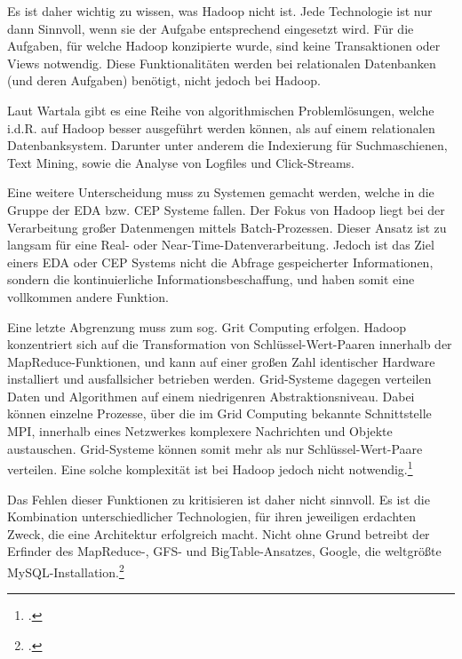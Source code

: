 Es ist daher wichtig zu wissen, was Hadoop nicht ist. Jede Technologie ist nur dann Sinnvoll, wenn sie der Aufgabe entsprechend eingesetzt wird. Für die Aufgaben, für welche Hadoop konzipierte wurde, sind keine Transaktionen oder Views notwendig. Diese Funktionalitäten werden bei relationalen Datenbanken (und deren Aufgaben) benötigt, nicht jedoch bei Hadoop.

Laut Wartala gibt es eine Reihe von algorithmischen Problemlösungen, welche i.d.R. auf Hadoop besser ausgeführt werden können, als auf einem relationalen Datenbanksystem. Darunter unter anderem die Indexierung für Suchmaschienen, Text Mining, sowie die Analyse von Logfiles und Click-Streams.

Eine weitere Unterscheidung muss zu Systemen gemacht werden, welche in die Gruppe der \ac{EDA} bzw. \ac{CEP} Systeme fallen. Der Fokus von Hadoop liegt bei der Verarbeitung großer Datenmengen mittels Batch-Prozessen. Dieser Ansatz ist zu langsam für eine Real- oder Near-Time-Datenverarbeitung. Jedoch ist das Ziel einers \ac{EDA} oder \ac{CEP} Systems nicht die Abfrage gespeicherter Informationen, sondern die kontinuierliche Informationsbeschaffung, und haben somit eine vollkommen andere Funktion.

Eine letzte Abgrenzung muss zum sog. Grit Computing erfolgen. Hadoop konzentriert sich auf die Transformation von Schlüssel-Wert-Paaren innerhalb der MapReduce-Funktionen, und kann auf einer großen Zahl identischer Hardware installiert und ausfallsicher betrieben werden. Grid-Systeme dagegen verteilen Daten und Algorithmen auf einem niedrigenren Abstraktionsniveau. Dabei können einzelne Prozesse, über die im Grid Computing bekannte Schnittstelle \ac{MPI}, innerhalb eines Netzwerkes komplexere Nachrichten und Objekte austauschen. Grid-Systeme können somit mehr als nur Schlüssel-Wert-Paare verteilen. Eine solche komplexität ist bei Hadoop jedoch nicht notwendig.\footcite[Vgl.][S. 30-33]{Wartala.2012}

Das Fehlen dieser Funktionen zu kritisieren ist daher nicht sinnvoll. Es ist die Kombination unterschiedlicher Technologien, für ihren jeweiligen erdachten Zweck, die eine Architektur erfolgreich macht. \flqq Nicht ohne Grund betreibt der Erfinder des MapReduce-, \ac{GFS}- und BigTable-Ansatzes, Google, die weltgrößte MySQL-Installation.\frqq\footcite[S. 31]{Wartala.2012}

